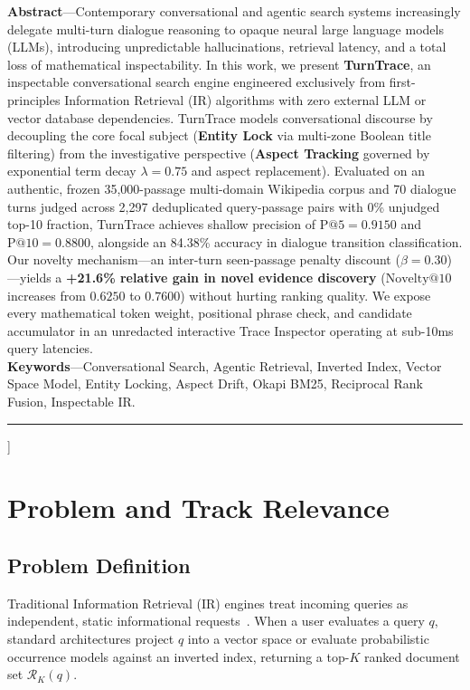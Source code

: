 \documentclass[10pt,a4paper,twocolumn]{article}
\begin{document}
  \begin{center}
  \parbox{0.96\textwidth}{
    \small
    \textbf{Abstract}---Contemporary conversational and agentic search systems increasingly delegate multi-turn dialogue reasoning to opaque neural large language models (LLMs), introducing unpredictable hallucinations, retrieval latency, and a total loss of mathematical inspectability. In this work, we present \textbf{TurnTrace}, an inspectable conversational search engine engineered exclusively from first-principles Information Retrieval (IR) algorithms with zero external LLM or vector database dependencies. TurnTrace models conversational discourse by decoupling the core focal subject (\textbf{Entity Lock} via multi-zone Boolean title filtering) from the investigative perspective (\textbf{Aspect Tracking} governed by exponential term decay $\lambda = 0.75$ and aspect replacement). Evaluated on an authentic, frozen 35,000-passage multi-domain Wikipedia corpus and 70 dialogue turns judged across 2,297 deduplicated query-passage pairs with 0\% unjudged top-10 fraction, TurnTrace achieves shallow precision of $\text{P@5} = 0.9150$ and $\text{P@10} = 0.8800$, alongside an 84.38\% accuracy in dialogue transition classification. Our novelty mechanism---an inter-turn seen-passage penalty discount ($\beta = 0.30$)---yields a \textbf{+21.6\% relative gain in novel evidence discovery} ($\text{Novelty@10}$ increases from $0.6250$ to $0.7600$) without hurting ranking quality. We expose every mathematical token weight, positional phrase check, and candidate accumulator in an unredacted interactive Trace Inspector operating at sub-10ms query latencies.\\[3pt]
    \textbf{Keywords}---Conversational Search, Agentic Retrieval, Inverted Index, Vector Space Model, Entity Locking, Aspect Drift, Okapi BM25, Reciprocal Rank Fusion, Inspectable IR.
  }
  \end{center}
  \vspace{4pt}
  \hrule
  \vspace{10pt}
]

\section{Problem and Track Relevance}
\label{sec:problem}

\subsection{Problem Definition}
Traditional Information Retrieval (IR) engines treat incoming queries as independent, static informational requests~\cite{manning2008introduction}. When a user evaluates a query $q$, standard architectures project $q$ into a vector space or evaluate probabilistic occurrence models against an inverted index, returning a top-$K$ ranked document set $\mathcal{R}_K(q)$.
\end{document}
